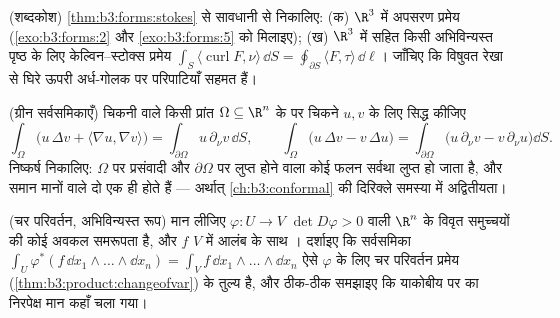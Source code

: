 \begin{exercise}[$\star\star$]\label{exo:b3:forms:7}
(शब्दकोश) \cref{thm:b3:forms:stokes} से सावधानी से निकालिए: (क) $\R^3$ में अपसरण प्रमेय
(\cref{exo:b3:forms:2} और \cref{exo:b3:forms:5} को मिलाइए); (ख) $\R^3$ में  सहित किसी 
अभिविन्यस्त पृष्ठ के लिए केल्विन--स्टोक्स प्रमेय $\int_S\langle\operatorname{curl}F, \nu\rangle\,\dd S =
\oint_{\partial S}\langle F, \tau\rangle\,\dd\ell$। जाँचिए कि
विषुवत रेखा से घिरे ऊपरी अर्ध-गोलक पर  परिपाटियाँ सहमत
हैं।
\end{exercise}

\begin{exercise}[$\star\star$]\label{exo:b3:forms:8}
(ग्रीन सर्वसमिकाएँ) चिकनी  वाले किसी  प्रांत $\Omega \subseteq \R^n$ के
 पर चिकने $u, v$ के लिए सिद्ध कीजिए
\[
\int_\Omega\bigl(u\,\Delta v + \langle\nabla u, \nabla
v\rangle\bigr) = \int_{\partial\Omega}u\,\partial_\nu
v\,\dd S,
\qquad
\int_\Omega\bigl(u\,\Delta v - v\,\Delta u\bigr) =
\int_{\partial\Omega}\bigl(u\,\partial_\nu v -
v\,\partial_\nu u\bigr)\dd S .
\]
निष्कर्ष निकालिए: $\Omega$ पर प्रसंवादी और $\partial\Omega$ पर लुप्त होने वाला
कोई फलन सर्वथा लुप्त हो जाता है, और समान  मानों वाले दो
 एक ही होते हैं --- अर्थात् \cref{ch:b3:conformal} की दिरिक्ले समस्या
में अद्वितीयता।
\end{exercise}

\begin{exercise}[$\star\star$]\label{exo:b3:forms:9}
(चर परिवर्तन, अभिविन्यस्त रूप) मान लीजिए $\varphi\colon U
\to V$ $\det
D\varphi > 0$ वाली $\R^n$
के विवृत समुच्चयों की कोई अवकल समरूपता है, और $f$ $V$ में 
आलंब के साथ । दर्शाइए कि  सर्वसमिका $\int_U\varphi^*(f\,\dd x_1\wedge\dots\wedge\dd x_n) =
\int_Vf\,\dd x_1\wedge\dots\wedge\dd x_n$ ऐसे $\varphi$
के लिए चर परिवर्तन प्रमेय (\cref{thm:b3:product:changeofvar}) के तुल्य है, और ठीक-ठीक समझाइए
कि याकोबीय पर का निरपेक्ष मान कहाँ चला गया।
\end{exercise}

